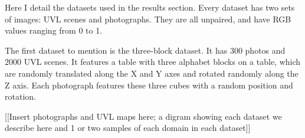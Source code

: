 \documentclass{article}
\begin{document}
Here I detail the datasets used in the results section. 
Every dataset has two sets of images: UVL scenes and photographs. They are all unpaired, and have RGB values ranging from 0 to 1.

The first dataset to mention is the three-block dataset.  
It has 300 photos and 2000 UVL scenes. It features a table with three alphabet blocks on a table, which are randomly translated along the X and Y axes and rotated randomly along the Z axis. Each photograph features these three cubes with a random position and rotation.

[[Insert photographs and UVL maps here; a digram showing each dataset we describe here and 1 or two samples of each domain in each dataset]]




\end{document}
